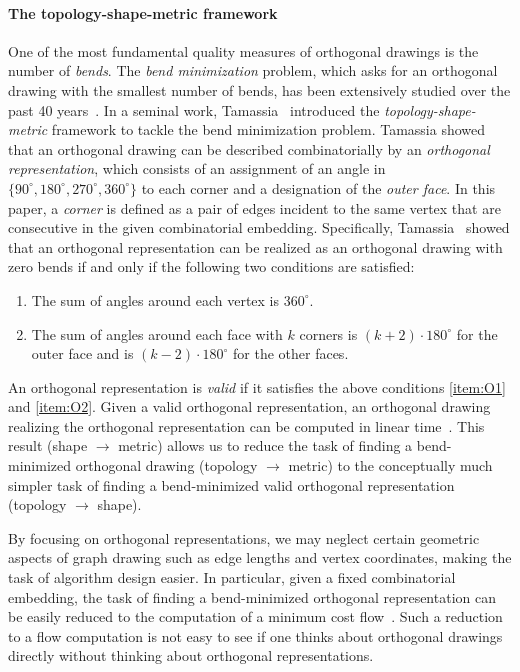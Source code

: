 \documentclass{article}\usepackage[a4paper,margin=20mm]{geometry}
\begin{document}
\paragraph{The topology-shape-metric framework}
One of the most fundamental quality measures of orthogonal drawings is the number of \emph{bends}.
The \emph{bend minimization} problem, which asks for an orthogonal drawing with the smallest number of bends, has been extensively studied over the past 40 years~\cite{CK12,BLV98,didimo2020optimal,GT96,storer1980node,tamassia1987embedding}.
In a seminal work, Tamassia~\cite{tamassia1987embedding} introduced the \emph{topology-shape-metric} framework to tackle the bend minimization problem.  Tamassia showed that an orthogonal drawing can be described combinatorially by an \emph{orthogonal representation}, which consists of an assignment of an angle in $\{90^\circ, 180^\circ, 270^\circ, 360^\circ\}$ to each corner and a designation of the \emph{outer face}. In this paper, a \emph{corner} is defined as a pair of edges incident to the same vertex that are consecutive in the given combinatorial embedding. Specifically, Tamassia~\cite{tamassia1987embedding} showed that an orthogonal representation can be realized as an orthogonal drawing with zero bends if and only if the following two conditions are satisfied:
\begin{enumerate}[(O1)]
    \item \label{item:O1} The sum of angles around each vertex is $360^\circ$.
    \item \label{item:O2} The sum of angles around each face with $k$ corners is $(k+2)\cdot 180^\circ$ for the outer face and is $(k-2)\cdot 180^\circ$ for the other faces.
\end{enumerate}


An orthogonal representation is \emph{valid} if it satisfies the above conditions \ref{item:O1} and \ref{item:O2}. Given a valid orthogonal representation, an orthogonal drawing realizing the orthogonal representation can be computed in linear time~\cite{hsueh1980symbolic,tamassia1987embedding}. 
This result (shape $\rightarrow$ metric) allows us to reduce the task of finding a bend-minimized orthogonal drawing (topology $\rightarrow$ metric) to the conceptually much simpler task of finding a bend-minimized valid orthogonal representation (topology $\rightarrow$ shape). 

By focusing on orthogonal representations, we may neglect certain geometric aspects of graph drawing such as edge lengths and vertex coordinates, making the task of algorithm design easier. In particular, given a fixed combinatorial embedding, the task of finding a bend-minimized orthogonal representation can be easily reduced to the  computation of a minimum cost flow~\cite{tamassia1987embedding}. Such a reduction to a flow computation is not easy to see if one thinks about orthogonal drawings directly without thinking about orthogonal representations. 
\end{document}
